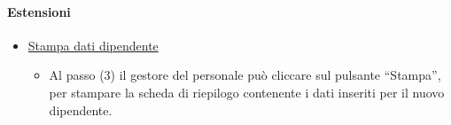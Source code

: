 \paragraph{Estensioni}
\begin{itemize}
	\item \underline{Stampa dati dipendente}
		\begin{itemize}
			\item Al passo (3) il gestore del personale può cliccare sul pulsante “Stampa”, per stampare la scheda di riepilogo contenente i dati inseriti per il nuovo dipendente.
		\end{itemize}
\end{itemize}